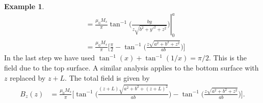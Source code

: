 \documentclass[11pt,a4paper,oneside]{book}
\numberwithin{equation}{section}
\theoremstyle{it}
\theoremstyle{definition}
\newtheorem{example}{Example}[section]
\begin{document}
\begin{example}
\begin{equation*}
\begin{aligned}
		&=\frac{\mu_0M_s}{\pi}\tan^{-1}\left. \Bigg(\frac{by}{z\sqrt{b^2+{y'}^2+z^2}}\Bigg)\right|_0^a \\[6pt]
		&=\frac{\mu_0M_s}{\pi}\Biggl[\frac{\pi}{2}-\tan^{-1}\Bigg(\frac{z\sqrt{a^2+b^2+z^2}}{ab}\Bigg)\Biggr]
	\end{aligned}
\end{equation*} 
In the last step we have used $\tan^{-1}(x) + \tan^{-1}(1/x)=\pi/2$. This is the field due to the top surface. A similar analysis applies to the bottom surface with $z$ replaced by $z+L$. The total field is given by
\begin{equation}\label{charge_model_15}
	\begin{aligned}
		B_z(z) &= \frac{\mu_0M_s}{\pi}\Biggl[\tan^{-1}\Bigg(\frac{(z+L)\sqrt{a^2+b^2+(z+L)^2}}{ab}\Bigg)-\tan^{-1}\Bigg(\frac{z\sqrt{a^2+b^2+z^2}}{ab}\Bigg)\Biggr].
	\end{aligned}
\end{equation} 
\end{example}
\end{document}
